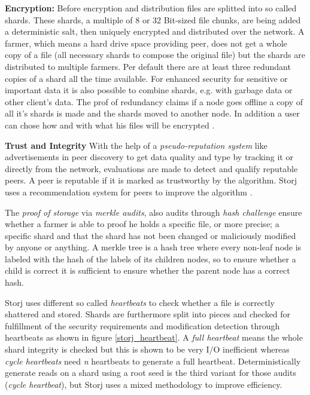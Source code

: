 \textbf{Encryption:} Before encryption and distribution files are splitted into so called shards. These shards, a multiple of 8 or 32 Bit-sized file chunks, are being added a deterministic salt, then uniquely encrypted and distributed over the network. A farmer, which means a hard drive space providing peer, does not get a whole copy of a file (all necessary shards to compose the original file) but the shards are distributed to multiple farmers. Per default there are at least three redundant copies of a shard all the time available. For enhanced security for sensitive or important data it is also possible to combine shards, e.g. with garbage data or other client's data. The prof of redundancy claims if a node goes offline a copy of all it's shards is made and the shards moved to another node. In addition a user can chose how and with what his files will be encrypted  \cite{storj:PDF}.

\textbf{Trust and Integrity} With the help of a \textit{pseudo-reputation system} like advertisements in peer discovery to get data quality and type by tracking it or directly from the network, evaluations are made to detect and qualify reputable peers. A peer is reputable if it is marked as trustworthy by the algorithm. Storj uses a recommendation system for peers to improve the algorithm \cite{storj:PDF}.

The \textit{proof of storage} via \textit{merkle audits}, also audits through \textit{hash challenge} ensure whether a farmer is able to proof he holds a specific file, or more precise; a specific shard and that the shard has not been changed or maliciously modified by anyone or anything. A merkle tree is a hash tree where every non-leaf node is labeled with the hash of the labels of its children nodes, so to ensure whether a child is correct it is sufficient to ensure whether the parent node has a correct hash.

Storj uses different so called \textit{heartbeats} to check whether a file is correctly shattered and stored. Shards are furthermore split into pieces and checked for fulfillment of the security requirements and modification detection through heartbeats as shown in figure \ref{storj_heartbeat}. A \textit{full heartbeat} means the whole shard integrity is checked but this is shown to be very I/O inefficient whereas \textit{cycle heartbeats} need \textsl{n} heartbeats to generate a full heartbeat. Deterministically generate reads on a shard using a root seed is the third variant for those audits (\textit{cycle heartbeat}), but Storj uses a mixed methodology to improve efficiency.

